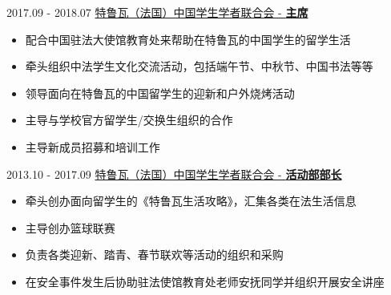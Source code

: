 \documentclass[letterpaper]{twentysecondcv} %
\begin{document}
\begin{twentyfluid}

    \twentyitemfluid
        {2017.09 - 2018.07}
        {}
        {\href{}{特鲁瓦（法国）中国学生学者联合会 - \textbf{主席}}}
        {}
        {
        {
        \vspace{-0.3cm}
        \begin{itemize}
            \item 配合中国驻法大使馆教育处来帮助在特鲁瓦的中国学生的留学生活
            \item 牵头组织中法学生文化交流活动，包括端午节、中秋节、中国书法等等
            \item 领导面向在特鲁瓦的中国留学生的迎新和户外烧烤活动
            \item 主导与学校官方留学生/交换生组织的合作
            \item 主导新成员招募和培训工作
        \end{itemize}}
        }

    \twentyitemfluid
        {2013.10 - 2017.09}
        {}
        {\href{}{特鲁瓦（法国）中国学生学者联合会 - \textbf{活动部部长}}}
        {}
        {
        {
        \vspace{-0.3cm}
        \begin{itemize}
            \item 牵头创办面向留学生的《特鲁瓦生活攻略》，汇集各类在法生活信息
            \item 主导创办篮球联赛
            \item 负责各类迎新、踏青、春节联欢等活动的组织和采购
            \item 在安全事件发生后协助驻法使馆教育处老师安抚同学并组织开展安全讲座
        \end{itemize}}
        }

\end{twentyfluid}
\end{document}
